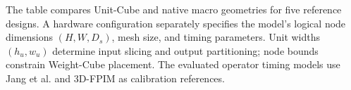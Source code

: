 \documentclass[conference,letterpaper,10pt]{IEEEtran}
\begin{document}


The table compares Unit-Cube and native macro geometries for five reference designs. A hardware configuration separately specifies the model's logical node dimensions $(H,W,D_s)$, mesh size, and timing parameters. Unit widths $(h_u,w_u)$ determine input slicing and output partitioning; node bounds constrain Weight-Cube placement. The evaluated operator timing models use Jang et al. and 3D-FPIM as calibration references.



\end{document}
